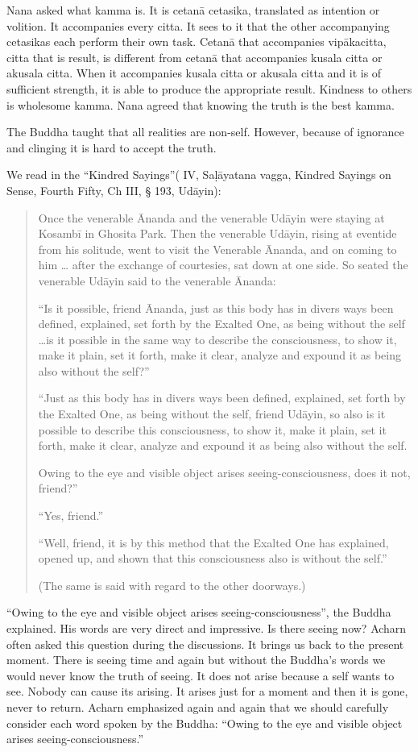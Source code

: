 Nana asked what kamma is. It is cetanā cetasika, translated as intention
or volition. It accompanies every citta. It sees to it that the other
accompanying cetasikas each perform their own task. Cetanā that
accompanies vipākacitta, citta that is result, is different from cetanā
that accompanies kusala citta or akusala citta. When it accompanies
kusala citta or akusala citta and it is of sufficient strength, it is
able to produce the appropriate result. Kindness to others is wholesome
kamma. Nana agreed that knowing the truth is the best kamma.

The Buddha taught that all realities are non-self. However, because of
ignorance and clinging it is hard to accept the truth.

We read in the ``Kindred Sayings''( IV, Saḷāyatana vagga, Kindred
Sayings on Sense, Fourth Fifty, Ch III, § 193, Udāyin):

\begin{quote}
Once the venerable Ānanda and the venerable Udāyin were staying at
Kosambī in Ghosita Park. Then the venerable Udāyin, rising at eventide
from his solitude, went to visit the Venerable Ānanda, and on coming to
him \ldots{} after the exchange of courtesies, sat down at one side. So
seated the venerable Udāyin said to the venerable Ānanda:

``Is it possible, friend Ānanda, just as this body has in divers ways
been defined, explained, set forth by the Exalted One, as being without
the self \ldots is it possible in the same way to describe the
consciousness, to show it, make it plain, set it forth, make it clear,
analyze and expound it as being also without the self?''

``Just as this body has in divers ways been defined, explained, set
forth by the Exalted One, as being without the self, friend Udāyin, so
also is it possible to describe this consciousness, to show it, make it
plain, set it forth, make it clear, analyze and expound it as being also
without the self.

Owing to the eye and visible object arises seeing-consciousness, does it
not, friend?''

``Yes, friend.''

``Well, friend, it is by this method that the Exalted One has explained,
opened up, and shown that this consciousness also is without the self.''

(The same is said with regard to the other doorways.)
\end{quote}

``Owing to the eye and visible object arises seeing-consciousness'', the
Buddha explained. His words are very direct and impressive. Is there
seeing now? Acharn often asked this question during the discussions. It
brings us back to the present moment. There is seeing time and again but
without the Buddha's words we would never know the truth of seeing. It
does not arise because a self wants to see. Nobody can cause its
arising. It arises just for a moment and then it is gone, never to
return. Acharn emphasized again and again that we should carefully
consider each word spoken by the Buddha: ``Owing to the eye and visible
object arises seeing-consciousness.''

